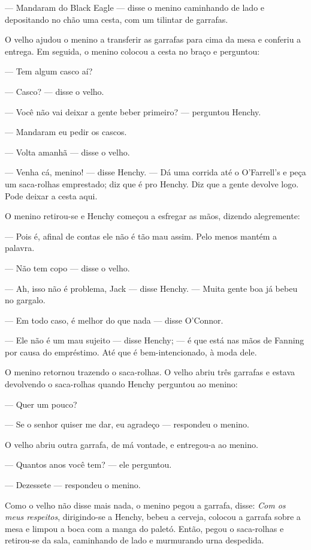 --- Mandaram do Black Eagle --- disse o menino caminhando de lado e
depositando no chão uma cesta, com um tilintar de garrafas.

O velho ajudou o menino a transferir as garrafas para cima da mesa e
conferiu a entrega. Em seguida, o menino colocou a cesta no braço e
perguntou:

--- Tem algum casco aí?

--- Casco? --- disse o velho.

--- Você não vai deixar a gente beber primeiro? --- perguntou
Henchy.

--- Mandaram eu pedir os cascos.

--- Volta amanhã --- disse o velho.

--- Venha cá, menino! --- disse Henchy. --- Dá uma corrida até o
O'Farrell's e peça um saca-rolhas emprestado; diz que é pro Henchy.
Diz que a gente devolve logo. Pode deixar a cesta aqui.

O menino retirou-se e Henchy começou a esfregar as mãos, dizendo
alegremente:

--- Pois é, afinal de contas ele não é tão mau assim. Pelo menos
mantém a palavra.

--- Não tem copo --- disse o velho.

--- Ah, isso não é problema, Jack --- disse Henchy. --- Muita gente
boa já bebeu no gargalo.

--- Em todo caso, é melhor do que nada --- disse O'Connor.

--- Ele não é um mau sujeito --- disse Henchy; --- é que está nas mãos de
Fanning por causa do empréstimo. Até que é bem-intencionado, à moda
dele.

O menino retornou trazendo o saca-rolhas. O velho abriu três garrafas e
estava devolvendo o saca-rolhas quando Henchy perguntou ao menino:

--- Quer um pouco?

--- Se o senhor quiser me dar, eu agradeço --- respondeu o menino.

O velho abriu outra garrafa, de má vontade, e entregou-a ao menino.

--- Quantos anos você tem? --- ele perguntou.

--- Dezessete --- respondeu o menino.

Como o velho não disse mais nada, o menino pegou a garrafa, disse:
\textit{Com os meus respeitos}, dirigindo-se a Henchy, bebeu a cerveja,
colocou a garrafa sobre a mesa e limpou a boca com a manga do paletó.
Então, pegou o saca-rolhas e retirou-se da sala, caminhando de lado
e murmurando urna despedida.

